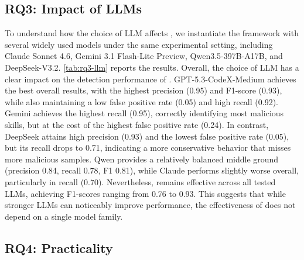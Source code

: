 \subsection{RQ3: Impact of LLMs}
\label{sec:rq3}

\begin{table}[t]
\centering
\caption{Performance of \toolname with different LLMs.}
\label{tab:rq3-llm}
\end{table}

To understand how the choice of LLM affects \toolname, we instantiate the framework with several widely used models under the same experimental setting, including Claude Sonnet 4.6, Gemini 3.1 Flash-Lite Preview, Qwen3.5-397B-A17B, and DeepSeek-V3.2. \autoref{tab:rq3-llm} reports the results.
Overall, the choice of LLM has a clear impact on the detection performance of \toolname. GPT-5.3-CodeX-Medium achieves the best overall results, with the highest precision (0.95) and F1-score (0.93), while also maintaining a low false positive rate (0.05) and high recall (0.92). Gemini achieves the highest recall (0.95), correctly identifying most malicious skills, but at the cost of the highest false positive rate (0.24). In contrast, DeepSeek attains high precision (0.93) and the lowest false positive rate (0.05), but its recall drops to 0.71, indicating a more conservative behavior that misses more malicious samples. Qwen provides a relatively balanced middle ground (precision 0.84, recall 0.78, F1 0.81), while Claude performs slightly worse overall, particularly in recall (0.70).
Nevertheless, \toolname remains effective across all tested LLMs, achieving F1-scores ranging from 0.76 to 0.93. This suggests that while stronger LLMs can noticeably improve performance, the effectiveness of \toolname does not depend on a single model family. 

\subsection{RQ4: Practicality}

